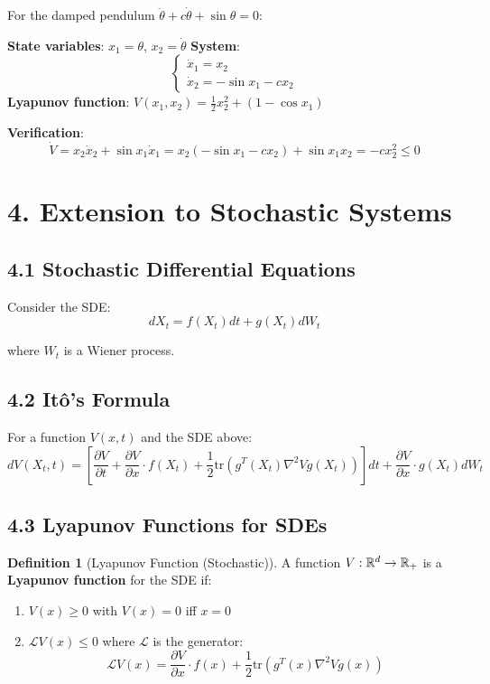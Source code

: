\documentclass{amsart}
\let\originalmathbb\mathbb
\renewcommand{\mathbb}[1]{%
    \ifstrequal{#1}{1}{\mathbbm{#1}}{\originalmathbb{#1}}%
}
\theoremstyle{plain}
\theoremstyle{definition}
\newtheorem{definition}[theorem]{Definition}
\theoremstyle{remark}
\begin{document}
For the damped pendulum $\ddot{\theta} + c\dot{\theta} + \sin\theta = 0$:

\textbf{State variables}: $x_1 = \theta$, $x_2 = \dot{\theta}$
\textbf{System}:
\[
\begin{cases}
\dot{x}_1 = x_2 \\
\dot{x}_2 = -\sin x_1 - cx_2
\end{cases}
\]
\textbf{Lyapunov function}: $V(x_1, x_2) = \frac{1}{2}x_2^2 + (1 - \cos x_1)$

\textbf{Verification}:
\[
\dot{V} = x_2\dot{x}_2 + \sin x_1 \dot{x}_1 = x_2(-\sin x_1 - cx_2) + \sin x_1 x_2 = -cx_2^2 \leq 0
\]

\section{4. Extension to Stochastic Systems}

\subsection{4.1 Stochastic Differential Equations}

Consider the SDE:
\[
dX_t = f(X_t)dt + g(X_t)dW_t
\]

where $W_t$ is a Wiener process.

\subsection{4.2 Itô's Formula}

For a function $V(x,t)$ and the SDE above:
\[
dV(X_t,t) = \left[\frac{\partial V}{\partial t} + \frac{\partial V}{\partial x} \cdot f(X_t) + \frac{1}{2}\text{tr}(g^T(X_t) \nabla^2 V g(X_t))\right]dt + \frac{\partial V}{\partial x} \cdot g(X_t)dW_t
\]

\subsection{4.3 Lyapunov Functions for SDEs}

\begin{definition}[Lyapunov Function (Stochastic)]
A function $V: \mathbb{R}^d \to \mathbb{R}_+$ is a \textbf{Lyapunov function} for the SDE if:
	\begin{enumerate}
		\item $V(x) \geq 0$ with $V(x) = 0$ iff $x = 0$
		\item $\mathcal{L}V(x) \leq 0$ where $\mathcal{L}$ is the generator:
\[
\mathcal{L}V(x) = \frac{\partial V}{\partial x} \cdot f(x) + \frac{1}{2}\text{tr}(g^T(x) \nabla^2 V g(x))
\]
	\end{enumerate}
\end{definition}
\end{document}

